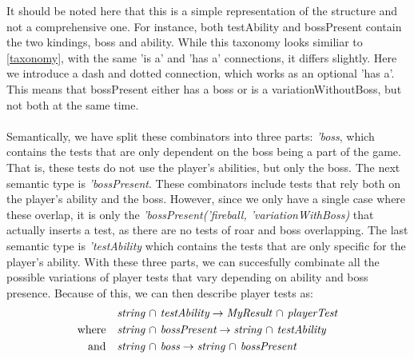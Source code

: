 It should be noted here that this is a simple representation of the structure and not a comprehensive one. For instance, both testAbility and bossPresent contain the two kindings, boss and ability. While this taxonomy looks similiar to \autoref{taxonomy}, with the same 'is a' and 'has a' connections, it differs slightly. Here we introduce a dash and dotted connection, which works as an optional 'has a'. This means that bossPresent either has a boss or is a variationWithoutBoss, but not both at the same time. \\
\\ 
Semantically, we have split these combinators into three parts: \textit{'boss}, which contains the tests that are only dependent on the boss being a part of the game. That is, these tests do not use the player's abilities, but only the boss. The next semantic type is \textit{'bossPresent}. These combinators include tests that rely both on the player's ability and the boss. However, since we only have a single case where these overlap, it is only the \textit{'bossPresent('fireball, 'variationWithBoss)} that actually inserts a test, as there are no tests of roar and boss overlapping. The last semantic type is \textit{'testAbility} which contains the tests that are only specific for the player's ability. With these three parts, we can succesfully combinate all the possible variations of player tests that vary depending on ability and boss presence. Because of this, we can then describe player tests as: 
\begin{align*}
	&\textit{string $\cap$ testAbility} \to \textit{MyResult $\cap$ playerTest} \\
	\text{where\quad} &\textit{string $\cap$ bossPresent} \to \textit{string $\cap$ testAbility} \\
	\text{and\quad} &\textit{string $\cap$ boss} \to \textit{string $\cap$ bossPresent}
\end{align*}
